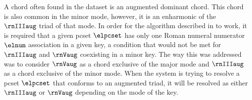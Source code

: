 
A chord often found in the dataset is an augmented dominant
chord. This chord is also common in the minor mode, however,
it is an enharmonic of the $\rnIIIaug$ triad of that mode.
In order for the algorithm described in
to work, it is required that a given \gls{pcset} $\elpcset$
has only one Roman numeral numerator $\elnum$ association in
a given key, a condition that would not be met for
$\rnIIIaug$ and $\rnVaug$ coexisting in a minor key. The way
this was addressed was to consider $\rnVaug$ as a chord
exclusive of the major mode and $\rnIIIaug$ as a chord
exclusive of the minor mode. When the system is trying to
resolve a \gls{pcset} $\elpcset$ that conforms to an
augmented triad, it will be resolved as either $\rnIIIaug$
or $\rnVaug$ depending on the mode of the key.
